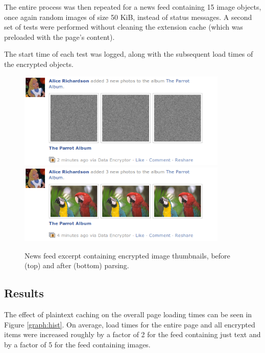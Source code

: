 The entire process was then repeated for a news feed containing 15 image objects, once again random images of size 50 KiB, instead of status messages. A second set of tests were performed without cleaning the extension cache (which was preloaded with the page's content).

The start time of each test was logged, along with the subsequent load times of the encrypted objects. 

    \begin{figure}[tb]
        \begin{center}
                \includegraphics[width=10cm]{screens/parrots1.png}
                \includegraphics[width=10cm]{screens/parrots2.png}
            \caption{News feed excerpt containing encrypted image thumbnails, before (top) and after (bottom) parsing.}
            \label{scn:parrots}
        \end{center}
    \end{figure}


\subsection{Results}

The effect of plaintext caching on the overall page loading times can be seen in Figure \ref{graph:hist}. On average, load times for the entire page and all encrypted items were increased roughly by a factor of 2 for the feed containing just text and by a factor of 5 for the feed containing images. 

